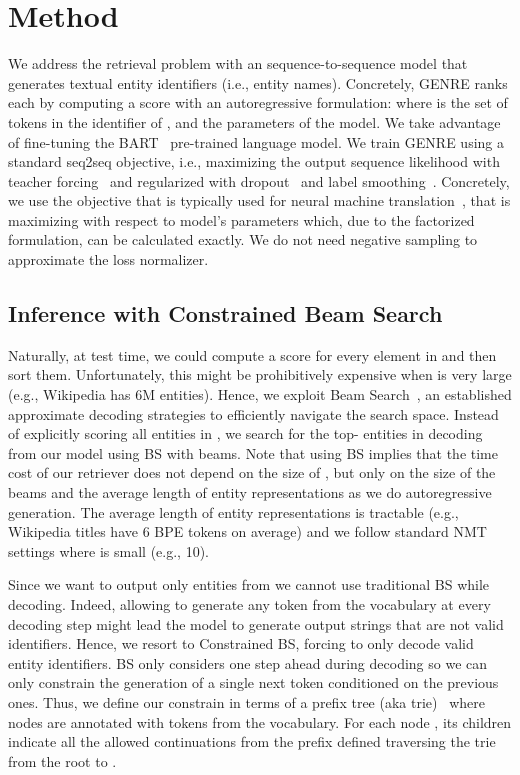\documentclass{article} \usepackage{main,times}
\makeatletter
\def\genre{\textsc{GENRE}\@\xspace}
\makeatother
\begin{document}
 
\section{Method} \label{sec:method}


We address the retrieval problem with an sequence-to-sequence model that generates textual entity identifiers (i.e., entity names). Concretely, \genre
ranks each  by computing a score with an autoregressive formulation:  where  is the set of  tokens in the identifier of , and  the parameters of the model.
We take advantage of fine-tuning the BART~\citep{lewis2019bart} pre-trained language model.
We train \genre using a standard seq2seq objective, i.e., maximizing the output sequence likelihood with teacher forcing~\citep{sutskever2011generating,sutskever2014sequence} and regularized with dropout~\citep{JMLR:v15:srivastava14a} and label smoothing~\citep{szegedy2016rethinking}.
Concretely, we use the objective that is typically used for neural machine translation~\citep[NMT,][]{wu2016google}, that is maximizing  with respect to model's parameters  which, due to the factorized formulation, can be calculated exactly. We do not need negative sampling to approximate the loss normalizer.


\subsection{Inference with Constrained Beam Search}

Naturally, at test time, we could compute a score for every element in  and then sort them. Unfortunately, this might be prohibitively expensive when  is very large (e.g., Wikipedia has 6M entities).
Hence, we exploit Beam Search~\citep[BS,][]{sutskever2014sequence}, an established approximate decoding strategies to efficiently navigate the search space.
Instead of explicitly scoring all entities in , we search for the top- entities in  decoding from our model using BS with  beams.
Note that using BS implies that the time cost of our retriever does not depend on the size of ,
but only on the size of the beams and the average length of entity representations as we do autoregressive generation.
The average length of entity representations is tractable (e.g., Wikipedia titles have 6 BPE tokens on average) and we follow standard NMT settings where  is small (e.g., 10).


Since we want to output only entities from  we cannot use traditional BS while decoding. Indeed, allowing to generate any token from the vocabulary at every decoding step might lead the model to generate output strings that are not valid identifiers.
Hence, we resort to Constrained BS, forcing to only decode valid entity identifiers.
BS only considers one step ahead during decoding so we can only constrain the generation of a single next token conditioned on the previous ones. Thus, we define our constrain in terms of a prefix tree  (aka trie)~\citep{cormen2009introduction} where nodes are annotated with tokens from the vocabulary. For each node , its children indicate all the allowed continuations from the prefix defined traversing the trie from the root to .
\end{document}
